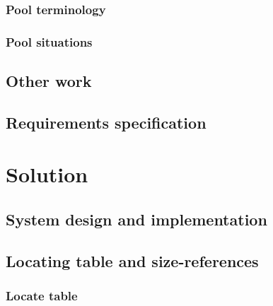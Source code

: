 		\subsection{Pool terminology}
			\label{sec:terminology}
			
	
		\subsection{Pool situations}
			\label{sec:situations}
			
	
		
	\section{Other work}
		\label{sec:otherwork}
		
					
	\section{Requirements specification}
		\label{sec:reqspec}
		

\chapter{Solution}
	\label{solution}
	

	\section{System design and implementation}
		\label{sec:sysdesign}
		
		
	\section{Locating table and size-references}
		\label{sec:table-intro}	
			
		
			\subsection{Locate table}
				\label{sec:table-locate}
				
		
		
